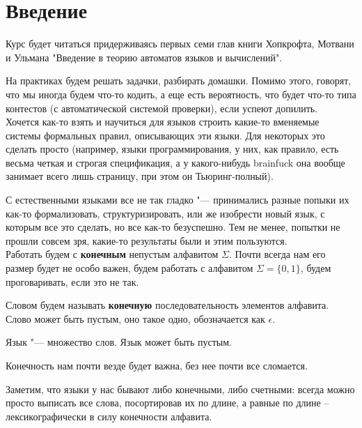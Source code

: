 
\section{Введение}
Курс будет читаться придерживаясь первых семи глав книги Хопкрофта, Мотвани и Ульмана "Введение в теорию автоматов языков и вычислений".

На практиках будем решать задачки, разбирать домашки.
Помимо этого, говорят, что мы иногда будем что-то кодить, а еще есть вероятность, что будет что-то типа контестов (с автоматической системой проверки), если успеют допилить. \\

Хочется как-то взять и научиться для языков строить какие-то вменяемые системы формальных правил, описывающих эти языки.
Для некоторых это сделать просто (например, языки программирования, у них, как правило, есть весьма четкая и строгая спецификация, 
а у какого-нибудь brainfuck она вообще занимает всего лишь страницу, при этом он Тьюринг-полный).

С естественными языками все не так гладко "--- принимались разные попыки их как-то формализовать, структуризировать, или же изобрести новый язык, с которым все это сделать, но все как-то безуспешно.
Тем не менее, попытки не прошли совсем зря, какие-то результаты были и этим пользуются. \\

Работать будем с \textbf{конечным} непустым алфавитом $\Sigma$. 
Почти всегда нам его размер будет не особо важен, будем работать с алфавитом $\Sigma = \{0, 1\}$, будем проговаривать, если это не так. 

\begin{Def}
Словом будем называть \textbf{конечную} последовательность элементов алфавита. 
Слово может быть пустым, оно такое одно, обозначается как $\epsilon$.
\end{Def}
\begin{Def}
Язык "--- множество слов. Язык может быть пустым.
\end{Def}
\begin{Rem}
Конечность нам почти везде будет важна, без нее почти все сломается.
\end{Rem}

Заметим, что языки у нас бывают либо конечными, либо счетными: всегда можно просто выписать все слова, посортировав их по длине, 
а равные по длине -- лексикографически в силу конечности алфавита.

